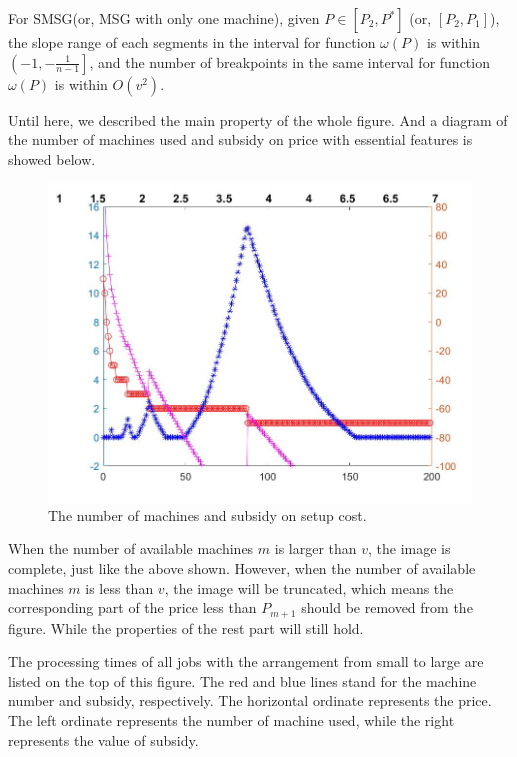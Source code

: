 \begin{thm}\label{thm5}
For SMSG(or, MSG with only one machine), given $P \in [P_2, P^*]$ (or, $[P_2,P_1]$),
the slope range of each segments in the interval for function $\omega(P)$ is within $\left(-1, -\frac{1}{n-1} \right]$, and the number of breakpoints in the same interval for function $\omega(P)$ is within $O(v^2)$.
\end{thm}

Until here, we described the main property of the whole figure.
And a diagram of the number of machines used and subsidy on price with essential features is showed below.

\begin{figure}[h]%
	\centering  %
	\includegraphics[width=0.8\linewidth]{Figures/Image30}  %
	\caption{The number of machines and subsidy on setup cost.}  %
	\label{fig:Image11}   %
\end{figure}


\begin{remark}
  When the number of available machines $m$ is larger than $v$, the image is complete, just like the above shown. However, when the number of available machines $m$ is less than $v$, the image will be truncated, which means the corresponding part of the price less than $P_{m+1}$ should be removed from the figure. While the properties of the rest part will still hold.
\end{remark}

The processing times of all jobs with the arrangement from small to large are listed on the top of this figure.
The red and blue lines stand for the machine number and subsidy, respectively.
The horizontal ordinate represents the price.
The left ordinate represents the number of machine used, while the right represents the value of subsidy.

